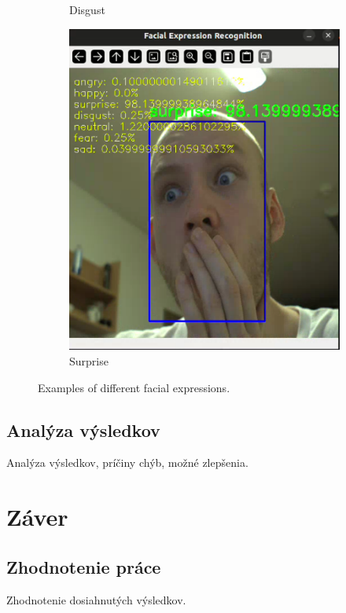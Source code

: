 \begin{itemize}
\begin{figure}[!htpb]
\begin{subfigure}[b]{0.45\textwidth}
        \caption{Disgust}
        \label{fig:disgust}
    \end{subfigure}
    \hfill
    \begin{subfigure}[b]{0.45\textwidth}
        \centering
        \includegraphics[width=\textwidth]{img/surprise.png}
        \caption{Surprise}
        \label{fig:surprise}
    \end{subfigure}
    \caption{Examples of different facial expressions.}
    \label{fig:expressions}
\end{figure}
\newpage
\subsection{Analýza výsledkov} Analýza výsledkov, príčiny chýb, možné zlepšenia.


\section{Záver}
\subsection{Zhodnotenie práce}Zhodnotenie dosiahnutých výsledkov.

\end{itemize}

